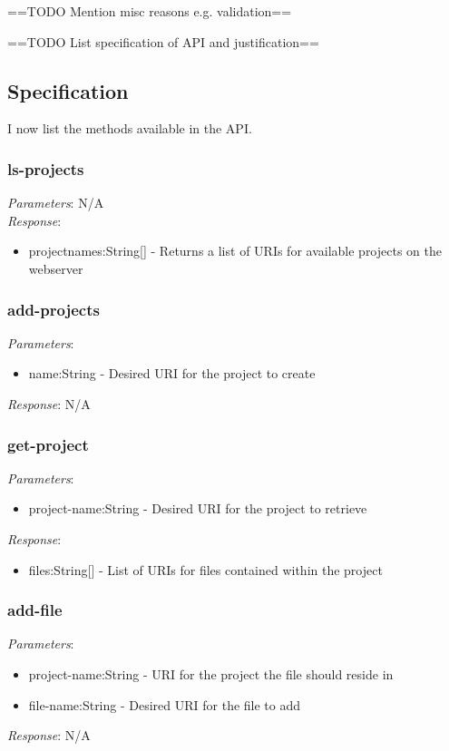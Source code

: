 \documentclass{article}
\begin{document}
==TODO Mention misc reasons e.g. validation==


==TODO List specification of API and justification==
\subsection{Specification}
I now list the methods available in the API.
\subsubsection{ls-projects}

\emph{Parameters}: N/A
\\
\emph{Response}: 
\begin{itemize}
\item projectnames:String[] - Returns a list of URIs for available projects on the webserver
\end{itemize} 

\subsubsection{add-projects}

\emph{Parameters}: 
\begin{itemize}
\item name:String - Desired URI for the project to create
\end{itemize}
\emph{Response}: N/A

\subsubsection{get-project}
\emph{Parameters}: 
\begin{itemize}
\item project-name:String - Desired URI for the project to retrieve
\end{itemize}
\emph{Response}: 
\begin{itemize}
\item files:String[] - List of URIs for files contained within the project 
\end{itemize}

\subsubsection{add-file}
\emph{Parameters}: 
\begin{itemize}
\item project-name:String - URI for the project the file should reside in
\item file-name:String - Desired URI for the file to add
\end{itemize}
\emph{Response}: N/A
\end{document}

